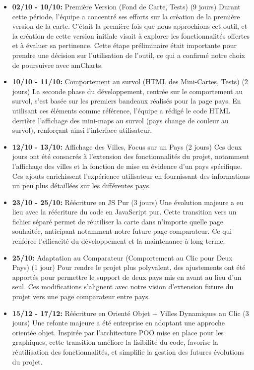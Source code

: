 \documentclass[mstat,12pt]{unswthesis}
\begin{document}
\begin{adjustwidth}{-2cm}{}
\begin{itemize}
\tightlist
\item
  \textbf{02/10 - 10/10:} Première Version (Fond de Carte, Tests) (9
  jours) Durant cette période, l'équipe a concentré ses efforts sur la
  création de la première version de la carte. C'était la première fois
  que nous approchions cet outil, et la création de cette version
  initiale visait à explorer les fonctionnalités offertes et à évaluer
  sa pertinence. Cette étape préliminaire était importante pour prendre
  une décision sur l'utilisation de l'outil, ce qui a confirmé notre
  choix de poursuivre avec amCharts.
\item
  \textbf{10/10 - 11/10:} Comportement au survol (HTML des Mini-Cartes,
  Tests) (2 jours) La seconde phase du développement, centrée sur le
  comportement au survol, s'est basée sur les premiers bandeaux réalisés
  pour la page pays. En utilisant ces éléments comme référence, l'équipe
  a rédigé le code HTML derrière l'affichage des mini-maps au survol
  (pays change de couleur au survol), renforçant ainsi l'interface
  utilisateur.
\item
  \textbf{12/10 - 13/10:} Affichage des Villes, Focus sur un Pays (2
  jours) Ces deux jours ont été consacrés à l'extension des
  fonctionnalités du projet, notamment l'affichage des villes et la
  fonction de mise en évidence d'un pays spécifique. Ces ajouts
  enrichissent l'expérience utilisateur en fournissant des informations
  un peu plus détaillées sur les différentes pays.
\item
  \textbf{23/10 - 25/10:} Réécriture en JS Pur (3 jours) Une évolution
  majeure a eu lieu avec la réécriture du code en JavaScript pur. Cette
  transition vers un fichier séparé permet de réutiliser la carte dans
  n'importe quelle page souhaitée, anticipant notamment notre future
  page comparateur. Ce qui renforce l'efficacité du développement et la
  maintenance à long terme.
\item
  \textbf{25/10:} Adaptation au Comparateur (Comportement au Clic pour
  Deux Pays) (1 jour) Pour rendre le projet plus polyvalent, des
  ajustements ont été apportés pour permettre le support de deux pays
  mis en avant au lieu d'un seul. Ces modifications s'alignent avec
  notre vision d'extension future du projet vers une page comparateur
  entre pays.
\item
  \textbf{15/12 - 17/12:} Réécriture en Orienté Objet + Villes
  Dynamiques au Clic (3 jours) Une refonte majeure a été entreprise en
  adoptant une approche orientée objet. Inspirée par l'architecture POO
  mise en place pour les graphiques, cette transition améliore la
  lisibilité du code, favorise la réutilisation des fonctionnalités, et
  simplifie la gestion des futures évolutions du projet.
\end{itemize}


\end{adjustwidth}
\end{document}
